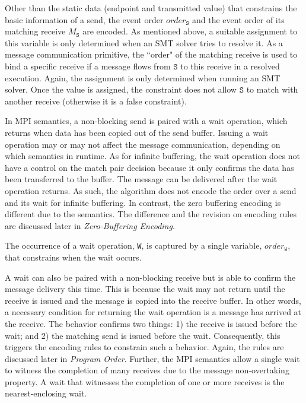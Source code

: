 Other than the static data (endpoint and transmitted value) that constrains the basic information of a send, the event order $\mathit{order}_\mathtt{S}$ and the event order of its matching receive $M_\mathtt{S}$ are encoded.  As mentioned above, a suitable assignment to this variable is only determined when an SMT solver tries to resolve it. As a message communication primitive, the ``order" of the matching receive is used to bind a specific receive if a message flows from $\mathtt{S}$ to this receive in a resolved execution. Again, the assignment is only determined when running an SMT solver. Once the value is assigned, the constraint does not allow $\mathtt{S}$ to match with another receive (otherwise it is a false constraint).

In MPI semantics, a non-blocking send is paired with a wait operation, which returns when data has been copied out of the send buffer. Issuing a wait operation may or may not affect the message communication, depending on which semantics in runtime. As for infinite buffering, the wait operation does not have a control on the match pair decision because it only confirms the data has been transferred to the buffer. The message can be delivered after the wait operation returns. As such, the algorithm does not encode the order over a send and its wait for infinite buffering. In contrast, the zero buffering encoding is different due to the semantics. The difference and the revision on encoding rules are discussed later in \textit{Zero-Buffering Encoding}. 
 
\begin{definition}[Wait] \label{def:wait}
The occurrence of a wait operation, \texttt{W}, is captured by a
single variable, $\mathit{order}_\mathtt{W}$, that constrains when
the wait occurs.
\end{definition}

A wait can also be paired with a non-blocking receive but is able to confirm the message delivery this time. This is because the wait may not return until the receive is issued and the message is copied into the receive buffer. In other words, a necessary condition for returning the wait operation is a message has arrived at the receive. The behavior confirms two things: 1) the receive is issued before the wait; and 2) the matching send is issued before the wait. Consequently, this triggers the encoding rules to constrain such a behavior. Again, the rules are discussed later in \textit{Program Order}.  Further, the MPI semantics allow a single wait to witness the completion of many receives due to the message non-overtaking property. A wait that witnesses the completion of one or more receives is the nearest-enclosing wait.

